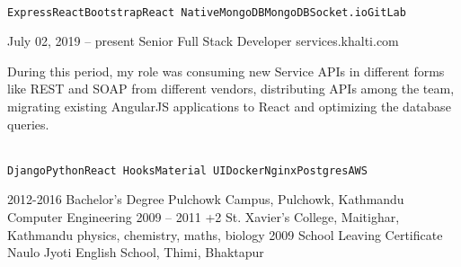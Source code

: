 \documentclass[9pt]{developercv} %
\begin{document}
\begin{entrylist}
{		
		\\ \texttt{Express}\slashsep\texttt{React}\slashsep\texttt{Bootstrap}\slashsep\texttt{React Native}\slashsep\texttt{MongoDB}\slashsep\texttt{MongoDB}\slashsep\texttt{Socket.io}\slashsep\texttt{GitLab}}
		
		
	  \entry
		 {July 02, 2019 -- present}
		{Senior Full Stack Developer}
		{services.khalti.com}
		{
		During this period, my role was consuming new Service APIs in different forms like REST and SOAP from different vendors, distributing APIs among the team,  migrating existing AngularJS applications to React and optimizing the database queries.
		
		\\ \texttt{Django}\slashsep\texttt{Python}\slashsep\texttt{React Hooks}\slashsep\texttt{Material UI}\slashsep\texttt{Docker}\slashsep\texttt{Nginx}\slashsep\texttt{Postgres}\slashsep\texttt{AWS}}
\end{entrylist}



\begin{entrylist}
	\entry
		{2012-2016}
		{Bachelor's Degree}
		{Pulchowk Campus, Pulchowk, Kathmandu}
		{Computer Engineering}
	\entry
		{2009 -- 2011}
		{+2}
		{St. Xavier's College, Maitighar, Kathmandu}
		{physics, chemistry, maths, biology}
	\entry
		{2009}
		{School Leaving Certificate}
		{Naulo Jyoti English School, Thimi, Bhaktapur}
		{\lorem\lorem}
\end{entrylist}

\end{document}
